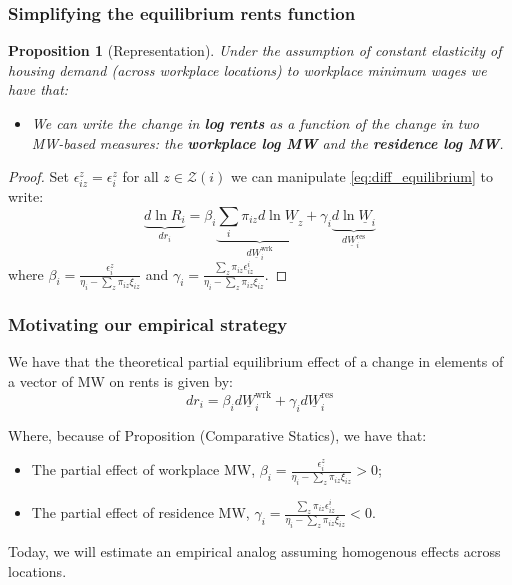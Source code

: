\documentclass[aspectratio=169, t]{beamer}
\newtheorem{prop}{Proposition}
\newcommand{\Z}{\mathcal{Z}}
\newcommand{\MW}{\underline{W}}
\begin{document}
\begin{frame}[label = representation_prop]
    \frametitle{Simplifying the equilibrium rents function}
    
    \begin{prop}[Representation]\label{prop:representation}
        Under the assumption of constant elasticity of housing demand (across workplace locations)
        to workplace minimum wages we have that:
        \begin{itemize}
            \item We can write the change in \textbf{log rents} as a function of the change in two 
            MW-based measures: the \textbf{workplace log MW} and the \textbf{residence log MW}.
        \end{itemize}
    \end{prop}

    \pause
    \vspace{2mm}

    \begin{proof}
        Set $\epsilon_{iz}^z = \epsilon_i^z$ for all $z\in\Z(i)$ 
        we can manipulate \eqref{eq:diff_equilibrium} to write:
        \begin{equation} \label{eq:theory_represenation}
            \underbrace{d \ln R_i}_{dr_i} 
                = \beta_i \underbrace{\sum_i \pi_{iz} d\ln \MW_z}_{d\MW^{\text{wrk}}_{i}}
                + \gamma_i \underbrace{d \ln \MW_i}_{d\MW^{\text{res}}_{i}}
        \end{equation}
        where $\beta_i = \frac{\epsilon_{i}^z}{\eta_{i} - \sum_z \pi_{iz} \xi_{iz}}$ 
        and $\gamma_i = \frac{\sum_z \pi_{iz} \epsilon_{iz}^i}{\eta_{i} - \sum_z \pi_{iz} \xi_{iz}}$.
    \end{proof}
\end{frame}

\begin{frame}
    \frametitle{Motivating our empirical strategy}
    We have that the theoretical partial equilibrium effect of a change in elements of a vector of MW on rents is given by:
        \begin{equation}
                d r_i = \beta_i d \MW^{\text{wrk}}_{i}+ \gamma_i d \MW^{\text{res}}_i
            \end{equation}
            
    Where, because of Proposition (Comparative Statics), we have that:
    \begin{itemize}
        \item The partial effect of workplace MW, $\beta_i = \frac{\epsilon_{i}^z}{\eta_{i} - \sum_z \pi_{iz} \xi_{iz}} > 0$;
        \item The partial effect of residence MW, $\gamma_i = \frac{\sum_z \pi_{iz} \epsilon_{iz}^i}{\eta_{i} 
                - \sum_z \pi_{iz} \xi_{iz}} < 0$.
    \end{itemize}

    \pause
    \vspace{2mm}
    Today, we will estimate an empirical analog assuming homogenous effects across 
    locations.

\end{frame}
\end{document}
